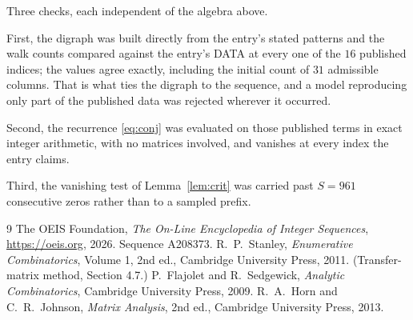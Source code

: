 \documentclass[11pt,a4paper]{article}
\theoremstyle{plain}
\theoremstyle{definition}
\begin{document}
Three checks, each independent of the algebra above.

First, the digraph was built directly from the entry's stated patterns and the walk counts
compared against the entry's DATA at every one of the $16$ published indices; the
values agree exactly, including the initial count of $31$ admissible columns. That is
what ties the digraph to the sequence, and a model reproducing only part of the published
data was rejected wherever it occurred.

Second, the recurrence \eqref{eq:conj} was evaluated on those published terms in exact
integer arithmetic, with no matrices involved, and vanishes at every index the entry claims.

Third, the vanishing test of Lemma~\ref{lem:crit} was carried past $S=961$ consecutive
zeros rather than to a sampled prefix.

\begin{thebibliography}{9}
 The OEIS Foundation, \emph{The On-Line Encyclopedia of Integer
Sequences}, \url{https://oeis.org}, 2026. Sequence A208373.
 R.~P.~Stanley, \emph{Enumerative Combinatorics}, Volume 1, 2nd ed.,
Cambridge University Press, 2011. (Transfer-matrix method, Section 4.7.)
 P.~Flajolet and R.~Sedgewick, \emph{Analytic Combinatorics}, Cambridge
University Press, 2009.
 R.~A.~Horn and C.~R.~Johnson, \emph{Matrix Analysis}, 2nd ed., Cambridge
University Press, 2013.
\end{thebibliography}
\end{document}
